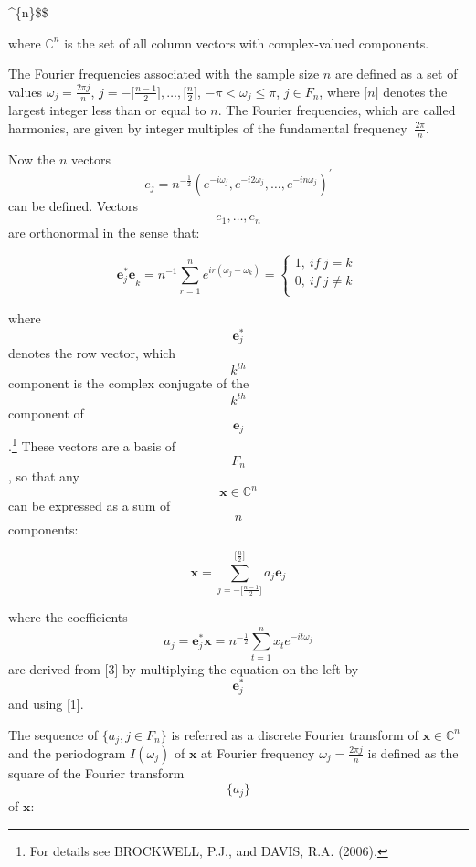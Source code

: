\documentclass[
  letterpaper,
  DIV=11,
  numbers=noendperiod]{scrreprt}
\begin{document}
\in {}\^{}\{n\}\$\$

where \(\mathbb{C}^{n}\) is the set of all column vectors with
complex-valued components.

The Fourier frequencies associated with the sample size \(n\) are
defined as a set of values \(ω_{j} = \frac{2\pi j}{n}\),
\(j = - \lbrack \frac{n-1}{2}\rbrack,\ldots,\lbrack\frac{n}{2}\rbrack\),
\(-\pi< \omega_{j} \leq \pi\), \(j\in F_{n}\), where
\({\lbrack n\rbrack}\) denotes the largest integer less than or equal to
\(n\). The Fourier frequencies, which are called harmonics, are given by
integer multiples of the fundamental frequency \(\ \frac{2\pi}{n}\).

Now the \(n\) vectors
\[e_{j} = n^{- \frac{1}{2}}\left(e^{-i\omega_{j}},e^{-i{2\omega}_{j}},
\ldots,e^{- inω_{j}}\right)^{'}\] can be defined. Vectors
\[e_{1},\ldots, e_{n}\] are orthonormal in the sense that:

\[
 {\mathbf{e}_{j}^{*}\mathbf{e}}_{k} = n^{- 1}\sum_{r = 1}^{n}e^{ir(\omega_{j} - \omega_{k})} = \left\{ \begin{matrix}  
  1,\ if\ j = k \\                                                                                                         
  0,\ if\ j \neq k \\                                                                                                      
  \end{matrix} \right.\ 
\]

where \[\mathbf{e}_{j}^{*}\] denotes the row vector, which \[k^{th}\]
component is the complex conjugate of the \[k^{th}\] component of
\[\mathbf{e}_{j}\].\footnote{For details see BROCKWELL, P.J., and DAVIS,
  R.A. (2006).} These vectors are a basis of \[F_{n}\], so that any
\[\mathbf{x}\in\mathbb{C}^{n}\] can be expressed as a sum of \[n\]
components:

\[
 \mathbf{x} = \sum_{j = - \lbrack\frac{n - 1}{2}\rbrack}^{\lbrack\frac{n}{2}\rbrack}{a_{j}\mathbf{e}_{j}}
\]

where the coefficients
\[a_{j} = \mathbf{e}_{j}^{*}\mathbf{x}=n^{-\frac{1}{2}}\sum_{t = 1}^{n}x_{t}e^{-it\omega_{j}}\]
are derived from {[}3{]} by multiplying the equation on the left by
\[\mathbf{e}_{j}^{*}\] and using {[}1{]}.

The sequence of \(\{a_{j},j\in F_{n}\}\) is referred as a discrete
Fourier transform of \(\mathbf{x}\mathbb{\in C}^{n}\) and the
periodogram \(I(\omega_{j})\) of \(\mathbf{x}\) at Fourier frequency
\(\omega_{j} = \frac{2\pi j}{n}\) is defined as the square of the
Fourier transform \[\{a_{j}\}\] of \(\mathbf{x}\):
\end{document}
